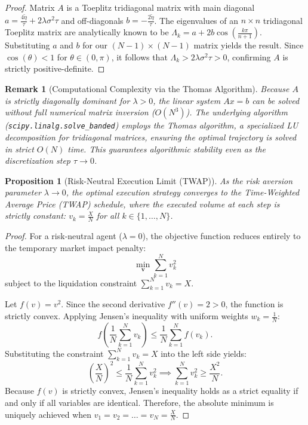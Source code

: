 \documentclass[11pt,a4paper]{article}
\newtheorem{proposition}[theorem]{Proposition}
\newtheorem{remark}[theorem]{Remark}
\begin{document}
\begin{proof}
Matrix $A$ is a Toeplitz tridiagonal matrix with main diagonal $a = \frac{4\tilde{\eta}}{\tau} + 2\lambda\sigma^2\tau$ and off-diagonals $b = -\frac{2\tilde{\eta}}{\tau}$. The eigenvalues of an $n \times n$ tridiagonal Toeplitz matrix are analytically known to be $\Lambda_k = a + 2b \cos\left(\frac{k\pi}{n+1}\right)$. Substituting $a$ and $b$ for our $(N-1) \times (N-1)$ matrix yields the result. Since $\cos(\theta) < 1$ for $\theta \in (0, \pi)$, it follows that $\Lambda_k > 2\lambda\sigma^2\tau > 0$, confirming $A$ is strictly positive-definite.
\end{proof}

\begin{remark}[Computational Complexity via the Thomas Algorithm]
Because $A$ is strictly diagonally dominant for $\lambda > 0$, the linear system $Ax = b$ can be solved without full numerical matrix inversion ($O(N^3)$). The underlying algorithm (\texttt{scipy.linalg.solve\_banded}) employs the Thomas algorithm, a specialized LU decomposition for tridiagonal matrices, ensuring the optimal trajectory is solved in strict $O(N)$ time. This guarantees algorithmic stability even as the discretization step $\tau \to 0$.
\end{remark}

\begin{proposition}[Risk-Neutral Execution Limit (TWAP)]
As the risk aversion parameter $\lambda \to 0$, the optimal execution strategy converges to the Time-Weighted Average Price (TWAP) schedule, where the executed volume at each step is strictly constant: $v_k = \frac{X}{N}$ for all $k \in \{1, \dots, N\}$.
\end{proposition}

\begin{proof}
For a risk-neutral agent ($\lambda = 0$), the objective function reduces entirely to the temporary market impact penalty:
\[ \min_{\mathbf{v}} \sum_{k=1}^N v_k^2 \]
subject to the liquidation constraint $\sum_{k=1}^N v_k = X$.

Let $f(v) = v^2$. Since the second derivative $f''(v) = 2 > 0$, the function is strictly convex. Applying Jensen's inequality with uniform weights $w_k = \frac{1}{N}$:
\[ f\left( \frac{1}{N} \sum_{k=1}^N v_k \right) \le \frac{1}{N} \sum_{k=1}^N f(v_k). \]
Substituting the constraint $\sum_{k=1}^N v_k = X$ into the left side yields:
\[ \left( \frac{X}{N} \right)^2 \le \frac{1}{N} \sum_{k=1}^N v_k^2 \implies \sum_{k=1}^N v_k^2 \ge \frac{X^2}{N}. \]
Because $f(v)$ is strictly convex, Jensen's inequality holds as a strict equality if and only if all variables are identical. Therefore, the absolute minimum is uniquely achieved when $v_1 = v_2 = \dots = v_N = \frac{X}{N}$.
\end{proof}
\end{document}
